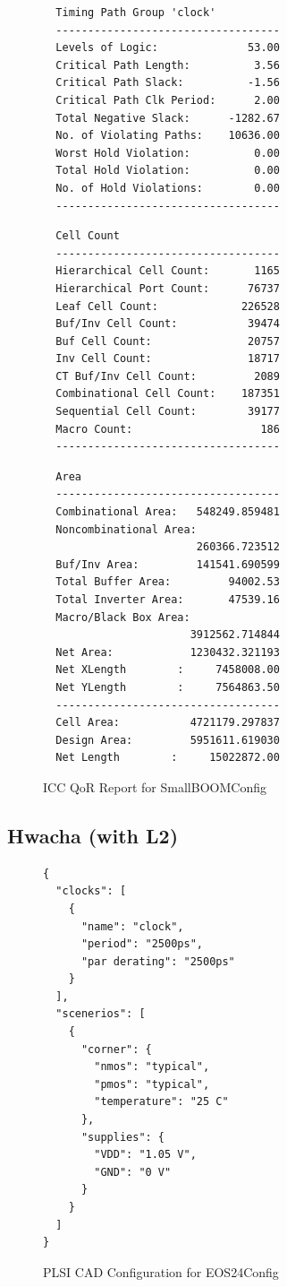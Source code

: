 \documentclass{article}
\begin{document}
\begin{figure}
\begin{multicols}{2}
\begin{verbatim}
  Timing Path Group 'clock'
  -----------------------------------
  Levels of Logic:              53.00
  Critical Path Length:          3.56
  Critical Path Slack:          -1.56
  Critical Path Clk Period:      2.00
  Total Negative Slack:      -1282.67
  No. of Violating Paths:    10636.00
  Worst Hold Violation:          0.00
  Total Hold Violation:          0.00
  No. of Hold Violations:        0.00
  -----------------------------------
\end{verbatim}

\begin{verbatim}
  Cell Count
  -----------------------------------
  Hierarchical Cell Count:       1165
  Hierarchical Port Count:      76737
  Leaf Cell Count:             226528
  Buf/Inv Cell Count:           39474
  Buf Cell Count:               20757
  Inv Cell Count:               18717
  CT Buf/Inv Cell Count:         2089
  Combinational Cell Count:    187351
  Sequential Cell Count:        39177
  Macro Count:                    186
  -----------------------------------
\end{verbatim}

\begin{verbatim}
  Area
  -----------------------------------
  Combinational Area:   548249.859481
  Noncombinational Area:
                        260366.723512
  Buf/Inv Area:         141541.690599
  Total Buffer Area:         94002.53
  Total Inverter Area:       47539.16
  Macro/Black Box Area:
                       3912562.714844
  Net Area:            1230432.321193
  Net XLength        :     7458008.00
  Net YLength        :     7564863.50
  -----------------------------------
  Cell Area:           4721179.297837
  Design Area:         5951611.619030
  Net Length        :     15022872.00
\end{verbatim}
\end{multicols}
  \caption{ICC QoR Report for SmallBOOMConfig}
  \label{res:boom-qor}
\end{figure}

\subsection{Hwacha (with L2)}

\begin{figure}
  \begin{verbatim}
{
  "clocks": [
    {
      "name": "clock",
      "period": "2500ps",
      "par derating": "2500ps"
    }
  ],
  "scenerios": [
    {
      "corner": {
        "nmos": "typical",
        "pmos": "typical",
        "temperature": "25 C"
      },
      "supplies": {
        "VDD": "1.05 V",
        "GND": "0 V"
      }
    }
  ]
}
\end{verbatim}
  \caption{PLSI CAD Configuration for EOS24Config}
  \label{res:hwacha-config}
\end{figure}
\end{document}
